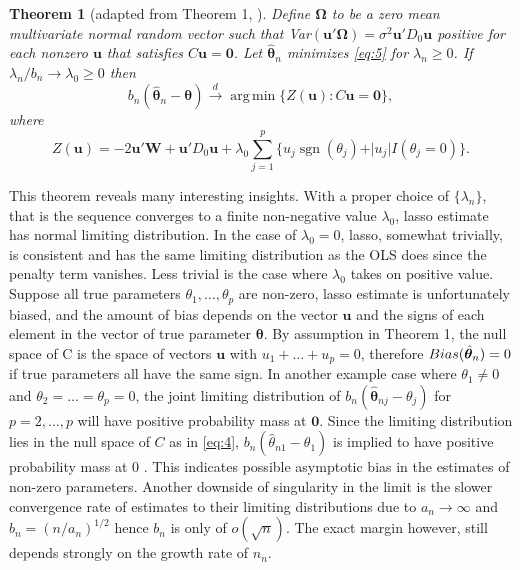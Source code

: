 \documentclass[12pt,a4paper]{article}
\DeclareMathOperator*{\argmin}{arg\,min} %
\DeclareMathOperator*{\sgn}{sgn} %
\newtheorem{theorem}{Theorem} %
\begin{document}
\begin{theorem} [adapted from Theorem 1, \cite{knight2008shrinkage}]
	Define $ \bm{\Omega} $ to be a zero mean multivariate normal random vector such that {\normalfont Var}$ (\bm{u}'\bm{\Omega}) = \sigma^2\bm{u}'D_0\bm{u} $ positive for each nonzero $ \bm{u} $ that satisfies $ C\bm{u} = \bm{0} $. Let $ \hat{\bm{\theta}}_n $ minimizes \eqref{eq:5} for $ \lambda_n \geq 0$. If $ \lambda_n/b_n \rightarrow \lambda_0 \geq 0 $ then
	\[
	b_n(\hat{\bm{\theta}}_n - \bm{\theta}) \overset{d}{\longrightarrow} 
	\argmin\{Z(\bm{u}):C\bm{u} = \bm{0}\},
	\] where \[
	Z(\bm{u}) = -2\bm{u}'\bm{W} + \bm{u}'D_0\bm{u} +
	\lambda_0\sum_{j = 1}^p\{u_j\sgn(\theta_j) + \vert u_j\vert I(\theta_j = 0)\}.
	\]
\end{theorem}
This theorem reveals many interesting insights. With a proper choice of $ \{\lambda_n\} $, that is the sequence converges to a finite non-negative value $ \lambda_0 $, lasso estimate has normal limiting distribution. In the case of $ \lambda_0 = 0 $, lasso, somewhat trivially, is consistent and has the same limiting distribution as the OLS does since the penalty term vanishes. Less trivial is the case where $ \lambda_0 $ takes on positive value. Suppose all true parameters $ \theta_1, \ldots, \theta_p $ are non-zero, lasso estimate is unfortunately biased, and the amount of bias  depends on the vector $ \bm{u} $ and the signs of each element in the vector of true parameter $ \bm{\theta} $. By assumption in Theorem 1, the null space of C is the space of vectors $ \bm{u} $ with $ u_1 + \ldots + u_p = 0 $, therefore $ {\normalfont Bias}(\hat{\bm{\theta}}_n) = 0 $ if true parameters all have the same sign. In another example case where $ \theta_1 \neq 0 $ and $ \theta_2 = \ldots = \theta_p = 0 $, the joint limiting distribution of $ b_n(\hat{\bm{\theta}}_{nj} - \theta_j) $ for $ p = 2, \ldots, p $ will have positive probability mass at $ \bm{0} $. Since the limiting distribution lies in the null space of $ C $ as in \eqref{eq:4}, $ b_n(\hat{\theta}_{n1} - \theta_1) $ is implied to have positive probability mass at 0 \citep{knight2008shrinkage}. This indicates possible asymptotic bias in the estimates of non-zero parameters. Another downside of singularity in the limit is the slower convergence rate of estimates to their limiting distributions due to $ a_n \rightarrow \infty $ and $ b_n = (n/a_n)^{1/2} $ hence $ b_n $ is only of $ o(\sqrt{n}) $. The exact margin however, still depends strongly on the growth rate of $ n_n $.
\end{document}
